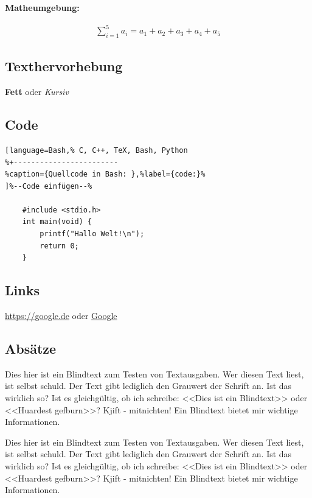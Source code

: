 \textbf{Matheumgebung:}

\begin{align*}
    \sum_{i=1}^5 a_i = a_1 + a_2 + a_3 + a_4 + a_5
\end{align*}

\subsection{Texthervorhebung}\label{texthervorhebung}

\textbf{Fett} oder \emph{Kursiv}

\subsection{Code}\label{code}

\begin{lstlisting}[language=Bash,% C, C++, TeX, Bash, Python 
%+------------------------
%caption={Quellcode in Bash: },%label={code:}% 
]%--Code einfügen--% 

    #include <stdio.h>
    int main(void) {
        printf("Hallo Welt!\n");
        return 0;
    }
\end{lstlisting}

\subsection{Links}\label{links}

\url{https://google.de} oder \href{https://google.de}{Google}

\subsection{Absätze}\label{absaetze}

Dies hier ist ein Blindtext zum Testen von Textausgaben. Wer diesen Text
liest, ist selbst schuld. Der Text gibt lediglich den Grauwert der
Schrift an. Ist das wirklich so? Ist es gleichgültig, ob ich schreibe:
<<Dies ist ein Blindtext>> oder <<Huardest gefburn>>? Kjift -
mitnichten! Ein Blindtext bietet mir wichtige Informationen.

Dies hier ist ein Blindtext zum Testen von Textausgaben. Wer diesen Text
liest, ist selbst schuld. Der Text gibt lediglich den Grauwert der
Schrift an. Ist das wirklich so? Ist es gleichgültig, ob ich schreibe:
<<Dies ist ein Blindtext>> oder <<Huardest gefburn>>? Kjift -
mitnichten! Ein Blindtext bietet mir wichtige Informationen.
